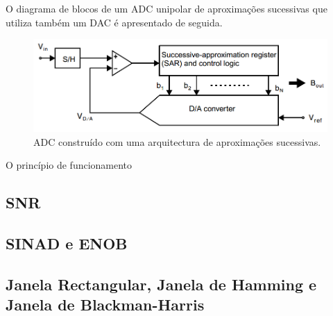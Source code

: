 \documentclass[11pt]{article}
\numberwithin{equation}{section}
\begin{document}
O diagrama de blocos de um ADC unipolar de aproximações sucessivas que utiliza também um DAC é apresentado de seguida.

\begin{figure}[h]
	\centering
	\includegraphics[keepaspectratio=true, scale=0.30]{./teoricas/SAR_2}
	\caption{ADC construído com uma arquitectura de aproximações sucessivas.}
	\vspace{-0.8em}
\end{figure}

O princípio de funcionamento 

\subsection{SNR}
\subsection{SINAD e ENOB}
\subsection{Janela Rectangular, Janela de Hamming e Janela de Blackman-Harris}
\end{document}
